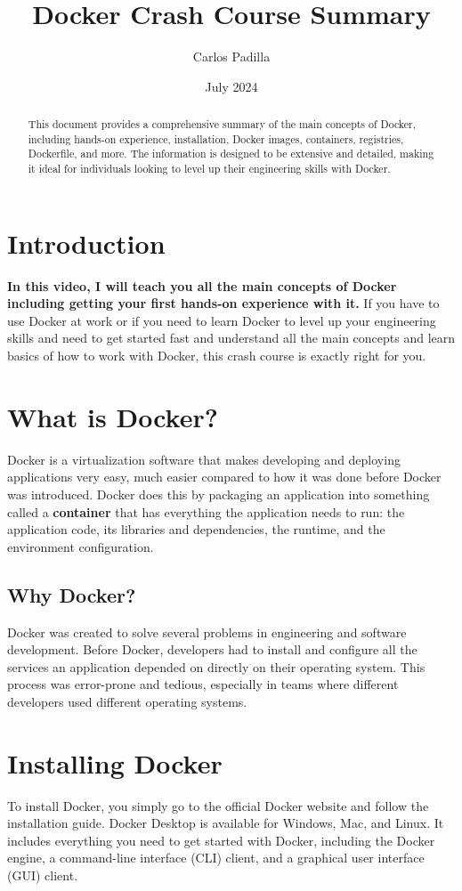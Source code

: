 \documentclass[12pt]{article}
\title{Docker Crash Course Summary}
\author{Carlos Padilla}
\date{July 2024}
\begin{document}
\maketitle

\begin{abstract}
This document provides a comprehensive summary of the main concepts of Docker, including hands-on experience, installation, Docker images, containers, registries, Dockerfile, and more. The information is designed to be extensive and detailed, making it ideal for individuals looking to level up their engineering skills with Docker.
\end{abstract}

\section{Introduction}

\textbf{In this video, I will teach you all the main concepts of Docker including getting your first hands-on experience with it.} If you have to use Docker at work or if you need to learn Docker to level up your engineering skills and need to get started fast and understand all the main concepts and learn basics of how to work with Docker, this crash course is exactly right for you.

\section{What is Docker?}
Docker is a virtualization software that makes developing and deploying applications very easy, much easier compared to how it was done before Docker was introduced. Docker does this by packaging an application into something called a \textbf{container} that has everything the application needs to run: the application code, its libraries and dependencies, the runtime, and the environment configuration.

\subsection{Why Docker?}
Docker was created to solve several problems in engineering and software development. Before Docker, developers had to install and configure all the services an application depended on directly on their operating system. This process was error-prone and tedious, especially in teams where different developers used different operating systems.

\section{Installing Docker}
To install Docker, you simply go to the official Docker website and follow the installation guide. Docker Desktop is available for Windows, Mac, and Linux. It includes everything you need to get started with Docker, including the Docker engine, a command-line interface (CLI) client, and a graphical user interface (GUI) client.
\end{document}
